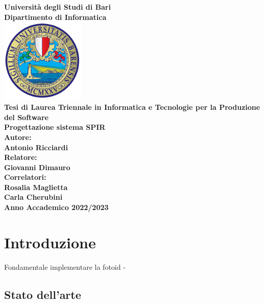 \documentclass[a4paper,12pt]{report}
\begin{document}

\begin{titlepage}
\centering

\textbf{\large Università degli Studi di Bari} \\
\vspace{0.5cm}
\textbf{\large Dipartimento di Informatica} \\
\vspace{2cm}
\includegraphics[width=40mm,scale=0.5]{assets/images/logo.png} \\
\vspace{2cm}
\textbf{\large Tesi di Laurea Triennale in Informatica e Tecnologie per la Produzione del Software} \\
\vspace{1cm}
\textbf{\LARGE Progettazione sistema SPIR} \\
\vspace{2cm}
\textbf{\large Autore:} \\
\textbf{Antonio Ricciardi} \\
\vspace{0.5cm}
\textbf{\large Relatore:} \\
\textbf{Giovanni Dimauro} \\
\vspace{0.5cm}
\textbf{\large Correlatori:} \\
\textbf{Rosalia Maglietta} \\
\textbf{Carla Cherubini} \\
\vfill
\textbf{\large Anno Accademico 2022/2023} %
    
\end{titlepage}

\tableofcontents
\chapter{Introduzione}
Fondamentale implementare la fotoid - 
\section{Stato dell'arte}
\end{document}
